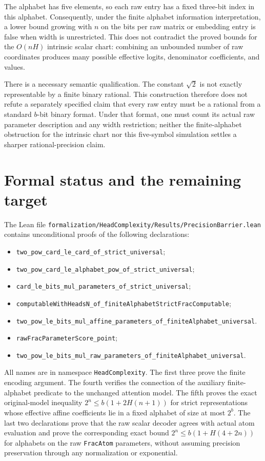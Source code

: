 \documentclass[11pt]{article}
\begin{document}
The alphabet has five elements, so each raw entry has a fixed
three-bit index in this alphabet. Consequently, under the finite
alphabet information interpretation, a lower bound growing with
$n$ on the bits per raw matrix or embedding entry is false when
width is unrestricted. This does not contradict the proved bounds
for the $O(nH)$ intrinsic scalar chart: combining an unbounded
number of raw coordinates produces many possible effective logits,
denominator coefficients, and values.

There is a necessary semantic qualification. The constant $\sqrt2$
is not exactly representable by a finite binary rational. This
construction therefore does not refute a separately specified claim
that every raw entry must be a rational from a standard $b$-bit
binary format. Under that format, one must count its actual raw
parameter description and any width restriction; neither the
finite-alphabet obstruction for the intrinsic chart nor this
five-symbol simulation settles a sharper rational-precision claim.

\section{Formal status and the remaining target}

The Lean file
\texttt{formalization/HeadComplexity/Results/PrecisionBarrier.lean}
contains unconditional proofs of the following declarations:
\begin{itemize}
\item \texttt{two\_pow\_card\_le\_card\_of\_strict\_universal};
\item \texttt{two\_pow\_card\_le\_alphabet\_pow\_of\_strict\_universal};
\item \texttt{card\_le\_bits\_mul\_parameters\_of\_strict\_universal};
\item \texttt{computableWithHeadsN\_of\_finiteAlphabetStrictFracComputable};
\item \texttt{two\_pow\_le\_bits\_mul\_affine\_parameters\_of\_finiteAlphabet\_universal}.
\item \texttt{rawFracParameterScore\_point};
\item \texttt{two\_pow\_le\_bits\_mul\_raw\_parameters\_of\_finiteAlphabet\_universal}.
\end{itemize}
All names are in namespace \texttt{HeadComplexity}. The first three
prove the finite encoding argument. The fourth verifies the connection
of the auxiliary finite-alphabet predicate to the unchanged attention
model. The fifth proves the exact original-model inequality
$2^n\le b(1+2H(n+1))$ for strict representations whose effective affine
coefficients lie in a fixed alphabet of size at most $2^b$.
The last two declarations prove that the raw scalar decoder agrees
with actual atom evaluation and prove the corresponding exact bound
$2^n\le b(1+H(4+2n))$ for alphabets on the raw \texttt{FracAtom}
parameters, without assuming precision preservation through any
normalization or exponential.
\end{document}
